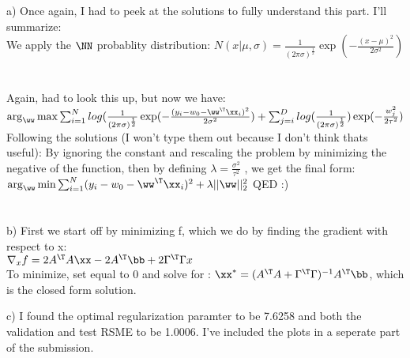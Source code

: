 \documentclass[12pt,letterpaper]{hmcpset}
\begin{document}
\begin{solution}

a) Once again, I had to peek at the solutions to fully understand this part. I'll summarize: \\
We apply the $\NN$  probablity distribution: $N(x|\mu, \sigma) = \frac{1}{(2\pi \sigma)^\frac{1}{2}} \exp(-\frac{(x-\mu)^2}{2\sigma^2})         $\\ \\ \\
Again, had to look this up, but now we have: $\arg_\ww \max \sum_{i=1}^{N}log(\frac{1}{(2\pi \sigma)^\frac{1}{2}} \exp(-\frac{(y_i - w_0 -\ww^\T\xx_i)^2}{2\sigma^2}) + \sum_{j=i}^{D}log(\frac{1}{(2\pi \sigma)^\frac{1}{2}}) \exp(-\frac{w^2_j}{2\tau^2})																					$ \\
Following the solutions (I won't type them out because I don't think thats useful): By ignoring the constant and rescaling the problem by minimizing the negative of the function, then by defining $\lambda = \frac{\sigma^2}{\tau^2}$ , we get the final form: \\
$ \arg_\ww \min \sum_{i=1}^N (y_i - w_0 -\ww^\T\xx_i)^2 + \lambda ||\ww||^2_2 $ QED :) \\ \\ \\

b) First we start off by minimizing f, which we do by finding the gradient with respect to x: \\$
\nabla_x f = 2A^\T A\xx - 2A^\T \bb + 2\Gamma^\T \Gamma x$ \\
To minimize, set equal to 0 and solve for \xx:   $ \xx^* = (A^\T A + \Gamma^\T \Gamma)^{-1} A^\T \bb$, which is the closed form solution. 

c) I found the optimal regularization paramter to be 7.6258 and both the validation and test RSME to be 1.0006. I've included the plots in a seperate part of the submission.

\end{solution}
\newpage
\end{document}

